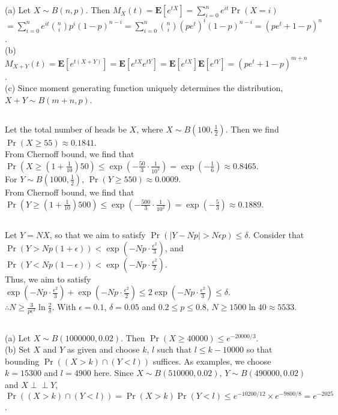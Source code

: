 \documentclass{article}
\begin{document}
\subsection{}
(a) Let $X\sim B(n,p)$. Then $M_X(t)=\textbf{E}[e^{tX}]=\sum\limits_{i=0}^ne^{it}\Pr(X=i)$\\
$=\sum\limits_{i=0}^ne^{it}\binom{n}{i}p^i(1-p)^{n-i}=\sum\limits_{i=0}^n\binom{n}{i}(pe^t)^i(1-p)^{n-i}=(pe^t+1-p)^n$.\\
(b) $M_{X+Y}(t)=\textbf{E}[e^{t(X+Y)}]=\textbf{E}[e^{tX}e^{tY}]=\textbf{E}[e^{tX}]\textbf{E}[e^{tY}]=(pe^t+1-p)^{m+n}$.\\
(c) Since moment generating function uniquely determines the distribution, $X+Y\sim B(m+n,p)$.
\subsection{}
Let the total number of heads be $X$, where $X\sim B(100,\frac{1}{2})$. Then we find $\Pr(X\geq55)\approx0.1841$.\\
From Chernoff bound, we find that $\Pr(X\geq (1+\frac{1}{10})50)\leq \exp(-\frac{50}{3}\cdot\frac{1}{10^2})=\exp(-\frac{1}{6})\approx0.8465$.\\
For $Y\sim B(1000,\frac{1}{2})$, $\Pr(Y\geq 550)\approx0.0009$.\\
From Chernoff bound, we find that $\Pr(Y\geq (1+\frac{1}{10})500)\leq \exp(-\frac{500}{3}\cdot\frac{1}{10^2})=\exp(-\frac{5}{3})\approx0.1889$.\\
\subsection{}
Let $Y=NX$, so that we aim to satisfy $\Pr(|Y-Np|>N\epsilon p) \leq \delta$. Consider that\\
$\Pr(Y>Np(1+\epsilon)) < \exp(-Np\cdot \frac{\epsilon^2}{3})$, and $\Pr(Y<Np(1-\epsilon)) < \exp(-Np\cdot \frac{\epsilon^2}{2})$.\\
Thus, we aim to satisfy $\exp(-Np\cdot \frac{\epsilon^2}{3})+\exp(-Np\cdot \frac{\epsilon^2}{2}) \leq 2\exp(-Np\cdot \frac{\epsilon^2}{3}) \leq \delta$.\\
$\therefore N \geq \frac{3}{p\epsilon^2} \ln \frac{2}{\delta}$. With $\epsilon=0.1$, $\delta=0.05$ and $0.2 \leq p \leq 0.8$, $N\geq1500\ln40\approx5533$.
\subsection{}
(a) Let $X\sim B(1000000, 0.02)$. Then $\Pr(X\geq 40000) \leq e^{-20000/3}$.\\
(b) Set $X$ and $Y$ as given and choose $k$, $l$ such that $l \leq k - 10000$ so that bounding $\Pr((X>k)\cap(Y<l))$ suffices.
As examples, we choose $k=15300$ and $l=4900$ here.
Since $X\sim B(510000, 0.02)$, $Y\sim B(490000,0.02)$ and $X \perp\!\!\!\perp Y$, $\Pr((X>k)\cap(Y<l)) = \Pr(X>k)\Pr(Y<l) \leq e^{-10200/12}\times e^{-9800/8} = e^{-2025}$.
\end{document}

